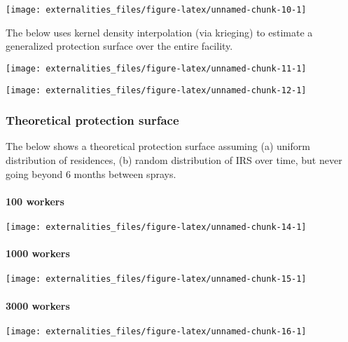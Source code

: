 \documentclass[]{article}
\let\oldparagraph\paragraph
\renewcommand{\paragraph}[1]{\oldparagraph{#1}\mbox{}}
\begin{document}
\begin{center}\texttt{[image: externalities\_files/figure-latex/unnamed-chunk-10-1]} \end{center}

The below uses kernel density interpolation (via krieging) to estimate a
generalized protection surface over the entire facility.

\begin{center}\texttt{[image: externalities\_files/figure-latex/unnamed-chunk-11-1]} \end{center}

\begin{center}\texttt{[image: externalities\_files/figure-latex/unnamed-chunk-12-1]} \end{center}

\subsubsection{Theoretical protection
surface}\label{theoretical-protection-surface}

The below shows a theoretical protection surface assuming (a) uniform
distribution of residences, (b) random distribution of IRS over time,
but never going beyond 6 months between sprays.

\paragraph{100 workers}\label{workers}

\begin{center}\texttt{[image: externalities\_files/figure-latex/unnamed-chunk-14-1]} \end{center}

\paragraph{1000 workers}\label{workers-1}

\begin{center}\texttt{[image: externalities\_files/figure-latex/unnamed-chunk-15-1]} \end{center}

\paragraph{3000 workers}\label{workers-2}

\begin{center}\texttt{[image: externalities\_files/figure-latex/unnamed-chunk-16-1]} \end{center}
\end{document}
